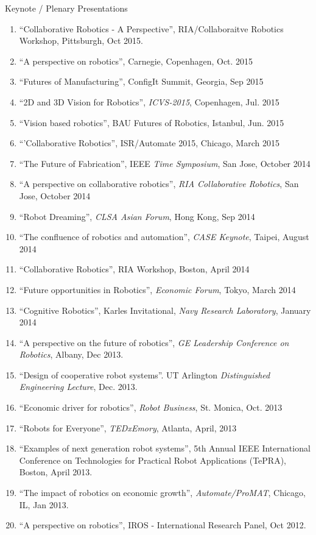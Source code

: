 \documentclass{article}
\begin{document}
\begin{cv}
\begin{cvlist}{Keynote / Plenary Presentations}
\begin{enumerate}
  \item ``Collaborative Robotics - A Perspective'', RIA/Collaboraitve Robotics Workshop, Pittsburgh, Oct 2015.
  \item ``A perspective on robotics'', Carnegie, Copenhagen, Oct. 2015
  \item ``Futures of Manufacturing'', ConfigIt Summit, Georgia, Sep 2015
  \item ``2D and 3D Vision for Robotics'', {\em ICVS-2015}, Copenhagen, Jul. 2015
  \item ``Vision based robotics'', BAU Futures of Robotics, Istanbul, Jun. 2015
  \item ``'Collaborative Robotics'', ISR/Automate 2015, Chicago, March 2015
  \item ``The Future of Fabrication'', IEEE {\em Time Symposium}, San Jose, October 2014
  \item ``A perspective on collaborative robotics'', {\em RIA Collaborative Robotics}, San Jose, October 2014
  \item ``Robot Dreaming'', {\em CLSA Asian Forum}, Hong Kong, Sep 2014
  \item ``The confluence of robotics and automation'', {\em CASE Keynote}, Taipei, August 2014
  \item ``Collaborative Robotics'', RIA Workshop, Boston, April 2014
  \item ``Future opportunities in Robotics'', {\em Economic Forum}, Tokyo, March 2014
  \item ``Cognitive Robotics'', Karles Invitational, {\em Navy Research Laboratory}, January 2014
  \item ``A perspective on the future of robotics'', {\em GE Leadership Conference on Robotics}, Albany, Dec 2013.
  \item ``Design of cooperative robot systems''. UT Arlington {\em Distinguished Engineering Lecture}, Dec. 2013.
  \item ``Economic driver for robotics'', {\em Robot Business}, St. Monica,  Oct. 2013
  \item ``Robots for Everyone'', {\em TEDxEmory}, Atlanta, April, 2013
  \item ``Examples of next generation robot systems'', 5th Annual IEEE
    International Conference on Technologies for Practical Robot
    Applications (TePRA), Boston, April 2013.
  \item ``The impact of robotics on economic growth'', {\em Automate/ProMAT}, Chicago, IL, Jan 2013.
  \item ``A perspective on robotics'', IROS - International Research  Panel, Oct 2012.

\end{enumerate}
\end{cvlist}
\end{cv}
\end{document}
